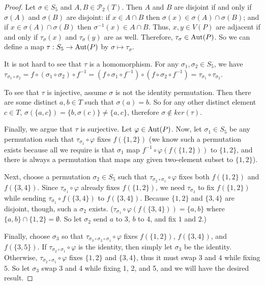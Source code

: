 \documentclass[12pt]{article}
\newcommand{\p}{\mathcal{P}_2(T)}
\newcommand{\Aut}{\textnormal{Aut}(P)}
\begin{document}
\begin{enumerate}[leftmargin=0cm,itemindent=.5cm,labelwidth=\itemindent,labelsep=0cm,align=left]
\begin{proof}
Let $\sigma \in S_5$ and $A,B \in \p$.  Then $A$ and $B$ are disjoint if and only if $\sigma(A)$ and $\sigma(B)$ are disjoint: if $x \in A \cap B$ then $\sigma(x) \in \sigma(A) \cap \sigma(B)$; and if $x \in \sigma(A) \cap \sigma(B)$ then $\sigma^{-1}(x) \in A \cap B$.  Thus, $x,y \in V(P)$ are adjacent if and only if $\tau_\sigma(x)$ and $\tau_\sigma(y)$ are as well.  Therefore, $\tau_\sigma \in \Aut$.  So we can define a map $\tau: S_5 \to \Aut$ by $\sigma \mapsto \tau_\sigma$.

It is not hard to see that $\tau$ is a homomorphism.  For any $\sigma_1, \sigma_2 \in S_5$, we have $\tau_{\sigma_1 \circ \sigma_2} = f \circ (\sigma_1 \circ \sigma_2) \circ f^{-1} = (f \circ \sigma_1 \circ f^{-1}) \circ (f \circ \sigma_2 \circ f^{-1}) = \tau_{\sigma_1} \circ \tau_{\sigma_2}$.

To see that $\tau$ is injective, assume $\sigma$ is not the identity permutation.  Then there are some distinct $a,b \in T$ such that $\sigma(a) = b$.  So for any other distinct element $c \in T$, $\sigma(\{a,c\}) = \{b,\sigma(c)\} \neq \{a,c\}$, therefore $\sigma \not \in ker(\tau)$.

Finally, we argue that $\tau$ is surjective.  Let $\varphi \in \Aut$.  Now, let $\sigma_1 \in S_5$ be any permutation such that $\tau_{\sigma_1} \circ \varphi$ fixes $f(\{1,2\})$ (we know such a permutation exists because all we require is that $\sigma_1$ map $f^{-1} \circ \varphi(f(\{1,2\}))$ to $\{1,2\}$, and there is always a permutation that maps any given two-element subset to $\{1,2\}$).

Next, choose a permutation $\sigma_2 \in S_5$ such that $\tau_{\sigma_2 \circ \sigma_1} \circ \varphi$ fixes both $f(\{1,2\})$ and $f(\{3,4\})$.  Since $\tau_{\sigma_1} \circ \varphi$ already fixes $f(\{1,2\})$, we need $\tau_{\sigma_2}$ to fix $f(\{1,2\})$ while sending $\tau_{\sigma_1} \circ f(\{3,4\})$ to $f(\{3,4\})$.  Because $\{1,2\}$ and $\{3,4\}$ are disjoint, though, such a $\sigma_2$ exists. ($\tau_{\sigma_1} \circ \varphi( f(\{3,4\})) = \{a,b\}$ where $\{a,b\} \cap \{1,2\} = \emptyset$.  So let $\sigma_2$ send $a$ to 3, $b$ to 4, and fix $1$ and $2$.)

Finally, choose $\sigma_3$ so that $\tau_{\sigma_3 \circ \sigma_2 \circ \sigma_1} \circ \varphi$ fixes $f(\{1,2\})$, $f(\{3,4\})$, and $f(\{3,5\})$.  If $\tau_{\sigma_2 \circ \sigma_1} \circ \varphi$ is the identity, then simply let $\sigma_3$ be the identity.  Otherwise, $\tau_{\sigma_2 \circ \sigma_1} \circ \varphi$ fixes $\{1,2\}$ and $\{3,4\}$, thus it must swap $3$ and $4$ while fixing $5$.  So let $\sigma_3$ swap 3 and 4 while fixing 1, 2, and 5, and we will have the desired result.  


\end{proof}
\end{enumerate}
\end{document}
